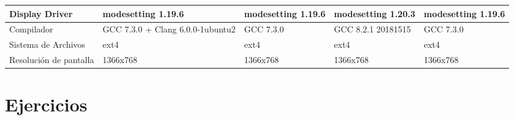 \documentclass{article}
\begin{document}
\begin{table}[H]
\begin{tabularx}{\linewidth}{|L|L|L|L|L|}
Display Driver         & modesetting 1.19.6                                     & modesetting 1.19.6                                          & modesetting 1.20.3                                                     & modesetting 1.19.6                                       \\ \hline
{}Compilador             & GCC 7.3.0 + Clang 6.0.0-1ubuntu2                       & GCC 7.3.0                                                   & GCC 8.2.1 20181515                                                     & GCC 7.3.0                                                \\ \hline
{}Sistema de Archivos    & ext4                                                   & ext4                                                        & ext4                                                                   & ext4                                                     \\ \hline
{}Resolución de pantalla & 1366x768                                               & 1366x768                                                    & 1366x768                                                               & 1366x768                                                 \\ \hline
\end{tabularx}
\end{table}


    \section{Ejercicios}
\end{document}
